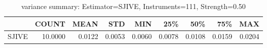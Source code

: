 \begin{table}[ht]
\centering
\caption{variance summary: Estimator=SJIVE, Instruments=111, Strength=0.50}
\begin{tabular}{lrrrrrrrr}
\toprule
 & COUNT & MEAN & STD & MIN & 25\% & 50\% & 75\% & MAX \\
\midrule
SJIVE & 10.0000 & 0.0122 & 0.0053 & 0.0060 & 0.0078 & 0.0108 & 0.0159 & 0.0204 \\
\bottomrule
\end{tabular}
\end{table}
